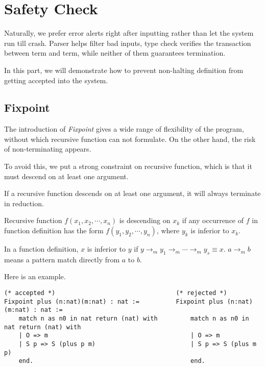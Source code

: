 \section{Safety Check}

Naturally, we prefer error alerts right after inputting rather than let the system run till crash. 
Parser helps filter bad inputs, type check verifies the transaction between term and term, while 
neither of them guarantees termination.\par
In this part, we will demonstrate how to prevent non-halting definition from getting accepted into
the system.

\subsection{Fixpoint}

The introduction of {\it Fixpoint} gives a wide range of flexibility of the program, without which recursive
function can not formulate. On the other hand, the risk of non-terminating appears.\par
To avoid this, we put a strong constraint on recursive function, which is that it must descend on at least one
argument. 
\begin{Prop}
If a recursive function descends on at least one argument, it will always terminate in reduction.
\end{Prop}
\begin{Def}[Descending]
Recursive function $f(x_1,x_2,\cdots,x_n)$ is descending on $x_k$ if any occurrence of $f$ in function definition has the 
form $f(y_1,y_2,\cdots,y_n)$, where $y_k$ is inferior to $x_k$.
\end{Def}
\begin{Def}[Inferior]
In a function definition, $x$ is inferior to $y$ if $y\to_m y_1\to_m \cdots\to_m y_s\equiv x$.
$a \to_m b$ means a pattern match directly from $a$ to $b$.
\end{Def}
Here is an example.
\begin{center}
\begin{verbatim}
(* accepted *)                                 (* rejected *)
Fixpoint plus (n:nat)(m:nat) : nat :=          Fixpoint plus (n:nat)(m:nat) : nat :=
    match n as n0 in nat return (nat) with         match n as n0 in nat return (nat) with    
    | O => m                                       | O => m
    | S p => S (plus p m)                          | S p => S (plus m p)
    end.                                           end.
\end{verbatim}
\end{center}

